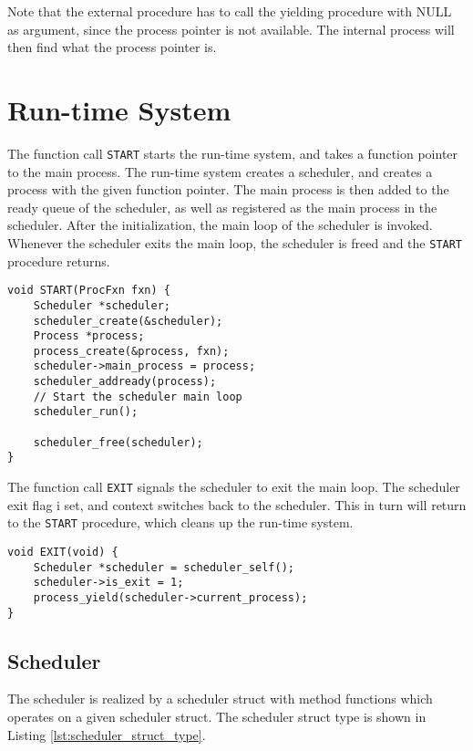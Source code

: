 Note that the external procedure has to call the yielding procedure with NULL as argument, since the process pointer is not available. The internal process will then find what the process pointer is.

\section{Run\hyp{}time System}

The function call \texttt{START} starts the run\hyp{}time system, and takes a function pointer to the main process. The run\hyp{}time system creates a scheduler, and creates a process with the given function pointer. The main process is then added to the ready queue of the scheduler, as well as registered as the main process in the scheduler. After the initialization, the main loop of the scheduler is invoked. Whenever the scheduler exits the main loop, the scheduler is freed and the \texttt{START} procedure returns. 

\begin{lstlisting}[style={CustomC},caption={\texttt{START} procedure}]
void START(ProcFxn fxn) {
    Scheduler *scheduler;
    scheduler_create(&scheduler);
    Process *process;
    process_create(&process, fxn);
    scheduler->main_process = process;
    scheduler_addready(process);
    // Start the scheduler main loop
    scheduler_run();

    scheduler_free(scheduler);
}
\end{lstlisting}

The function call \texttt{EXIT} signals the scheduler to exit the main loop. The scheduler exit flag i set, and context switches back to the scheduler. This in turn will return to the \texttt{START} procedure, which cleans up the run\hyp{}time system. 

\begin{lstlisting}[style={CustomC},caption={\texttt{EXIT} procedure}]
void EXIT(void) {
    Scheduler *scheduler = scheduler_self();
    scheduler->is_exit = 1;
    process_yield(scheduler->current_process);
}
\end{lstlisting}

\subsection{Scheduler}

The scheduler is realized by a scheduler struct with method functions which operates on a given scheduler struct. The scheduler struct type is shown in Listing \ref{lst:scheduler_struct_type}.

